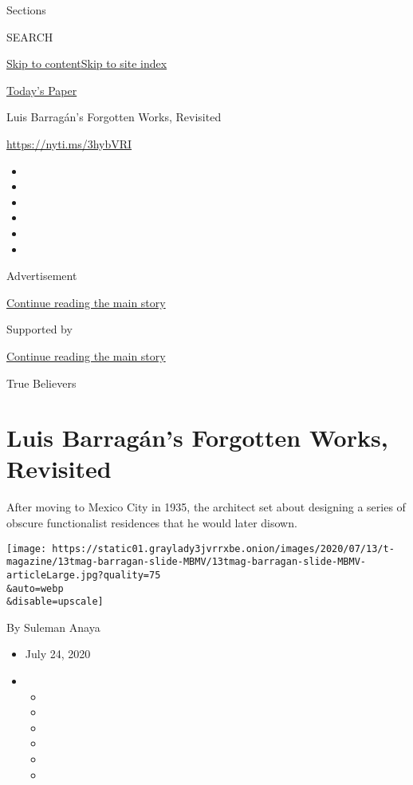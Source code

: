Sections

SEARCH

\protect\hyperlink{site-content}{Skip to
content}\protect\hyperlink{site-index}{Skip to site index}

\href{https://myaccount.nytimes3xbfgragh.onion/auth/login?response_type=cookie\&client_id=vi}{}

\href{https://www.nytimes3xbfgragh.onion/section/todayspaper}{Today's
Paper}

Luis Barragán's Forgotten Works, Revisited

\url{https://nyti.ms/3hybVRI}

\begin{itemize}
\item
\item
\item
\item
\item
\item
\end{itemize}

Advertisement

\protect\hyperlink{after-top}{Continue reading the main story}

Supported by

\protect\hyperlink{after-sponsor}{Continue reading the main story}

True Believers

\hypertarget{luis-barraguxe1ns-forgotten-works-revisited}{%
\section{Luis Barragán's Forgotten Works,
Revisited}\label{luis-barraguxe1ns-forgotten-works-revisited}}

After moving to Mexico City in 1935, the architect set about designing a
series of obscure functionalist residences that he would later disown.

\texttt{[image: https://static01.graylady3jvrrxbe.onion/images/2020/07/13/t-magazine/13tmag-barragan-slide-MBMV/13tmag-barragan-slide-MBMV-articleLarge.jpg?quality=75\\\&auto=webp\\\&disable=upscale]}

By Suleman Anaya

\begin{itemize}
\item
  July 24, 2020
\item
  \begin{itemize}
  \item
  \item
  \item
  \item
  \item
  \item
  \end{itemize}
\end{itemize}

